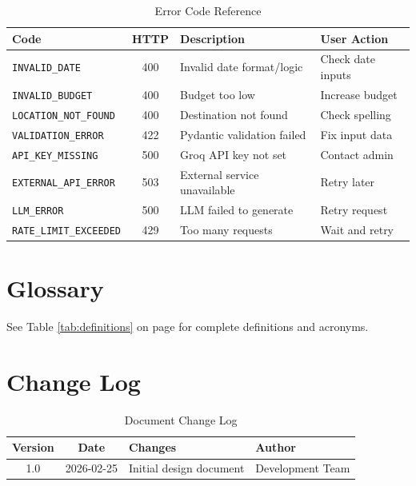 \documentclass[12pt,a4paper]{report}
\begin{document}
\begin{table}[H]
\centering
\small
\begin{tabular}{|l|c|p{5cm}|p{4cm}|}
\hline
\textbf{Code} & \textbf{HTTP} & \textbf{Description} & \textbf{User Action} \\
\hline
\texttt{INVALID\_DATE} & 400 & Invalid date format/logic & Check date inputs \\
\hline
\texttt{INVALID\_BUDGET} & 400 & Budget too low & Increase budget \\
\hline
\texttt{LOCATION\_NOT\_FOUND} & 400 & Destination not found & Check spelling \\
\hline
\texttt{VALIDATION\_ERROR} & 422 & Pydantic validation failed & Fix input data \\
\hline
\texttt{API\_KEY\_MISSING} & 500 & Groq API key not set & Contact admin \\
\hline
\texttt{EXTERNAL\_API\_ERROR} & 503 & External service unavailable & Retry later \\
\hline
\texttt{LLM\_ERROR} & 500 & LLM failed to generate & Retry request \\
\hline
\texttt{RATE\_LIMIT\_EXCEEDED} & 429 & Too many requests & Wait and retry \\
\hline
\end{tabular}
\caption{Error Code Reference}
\label{tab:error-codes}
\end{table}

\section{Glossary}

See Table \ref{tab:definitions} on page \pageref{tab:definitions} for complete definitions and acronyms.

\section{Change Log}

\begin{table}[H]
\centering
\begin{tabular}{|c|c|p{7cm}|p{3cm}|}
\hline
\textbf{Version} & \textbf{Date} & \textbf{Changes} & \textbf{Author} \\
\hline
1.0 & 2026-02-25 & Initial design document & Development Team \\
\hline
\end{tabular}
\caption{Document Change Log}
\label{tab:changelog}
\end{table}
\end{document}
